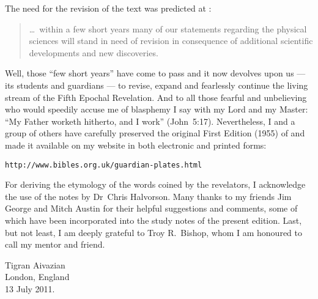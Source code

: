 The need for the revision of the text was predicted at :

\begin{quote}
\ldots\ within a few short years many of our statements regarding the physical sciences will stand in need of revision in consequence of additional scientific developments and new discoveries.
\end{quote}

Well, those ``few short years'' have come to pass and it now devolves upon us --- its students and guardians --- to revise,
expand and fearlessly continue the living stream of the Fifth Epochal Revelation.
And to all those fearful and unbelieving who would speedily accuse me of blasphemy I say with my Lord and my Master:
``My Father worketh hitherto, and I work'' (John~5:17).
Nevertheless, I and a group of others have carefully preserved the original First Edition (1955) of 
and made it available on my website in both electronic and printed forms:

\begin{center}
\texttt{\normalsize http://www.bibles.org.uk/guardian-plates.html}
\end{center}

For deriving the etymology of the words coined by the revelators, I acknowledge the use of the notes by Dr~Chris Halvorson.
Many thanks to my friends Jim George and Mitch Austin for their helpful suggestions and comments,
some of which have been incorporated into the study notes of the present edition.
Last, but not least, I am deeply grateful to Troy R.~Bishop, whom I am honoured to call my mentor and friend.


\begin{center}
\authorfont\fontsize{20}{24}\selectfont\textcolor{ubdarkblue}{%
Tigran Aivazian\\
London, England\\
13 July 2011.\\
}
\end{center}
